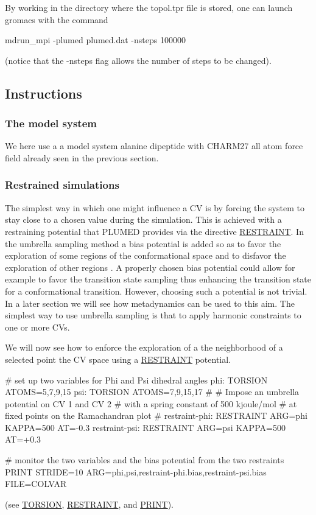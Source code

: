 By working in the directory where the topol.\+tpr file is stored, one can launch gromacs with the command \begin{DoxyVerb}mdrun_mpi -plumed plumed.dat -nsteps 100000
\end{DoxyVerb}
 (notice that the -\/nsteps flag allows the number of steps to be changed).\hypertarget{belfast-4_belfast-4-instructions}{}\subsection{Instructions}\label{belfast-4_belfast-4-instructions}
\hypertarget{belfast-4_belfast-4-system}{}\subsubsection{The model system}\label{belfast-4_belfast-4-system}
We here use a a model system alanine dipeptide with C\+H\+A\+R\+M27 all atom force field already seen in the previous section.\hypertarget{belfast-4_belfast-4-restrained-simulations}{}\subsubsection{Restrained simulations}\label{belfast-4_belfast-4-restrained-simulations}
The simplest way in which one might influence a C\+V is by forcing the system to stay close to a chosen value during the simulation. This is achieved with a restraining potential that P\+L\+U\+M\+E\+D provides via the directive \hyperlink{RESTRAINT}{R\+E\+S\+T\+R\+A\+I\+N\+T}. In the umbrella sampling method a bias potential is added so as to favor the exploration of some regions of the conformational space and to disfavor the exploration of other regions \cite{torrie-valleau} . A properly chosen bias potential could allow for example to favor the transition state sampling thus enhancing the transition state for a conformational transition. However, choosing such a potential is not trivial. In a later section we will see how metadynamics can be used to this aim. The simplest way to use umbrella sampling is that to apply harmonic constraints to one or more C\+Vs.

We will now see how to enforce the exploration of a the neighborhood of a selected point the C\+V space using a \hyperlink{RESTRAINT}{R\+E\+S\+T\+R\+A\+I\+N\+T} potential.

\begin{DoxyVerb}# set up two variables for Phi and Psi dihedral angles 
phi: TORSION ATOMS=5,7,9,15
psi: TORSION ATOMS=7,9,15,17
#
# Impose an umbrella potential on CV 1 and CV 2
# with a spring constant of 500 kjoule/mol
# at fixed points on the Ramachandran plot
#
restraint-phi: RESTRAINT ARG=phi KAPPA=500 AT=-0.3
restraint-psi: RESTRAINT ARG=psi KAPPA=500 AT=+0.3

# monitor the two variables and the bias potential from the two restraints
PRINT STRIDE=10 ARG=phi,psi,restraint-phi.bias,restraint-psi.bias FILE=COLVAR\end{DoxyVerb}
 (see \hyperlink{TORSION}{T\+O\+R\+S\+I\+O\+N}, \hyperlink{RESTRAINT}{R\+E\+S\+T\+R\+A\+I\+N\+T}, and \hyperlink{PRINT}{P\+R\+I\+N\+T}).

